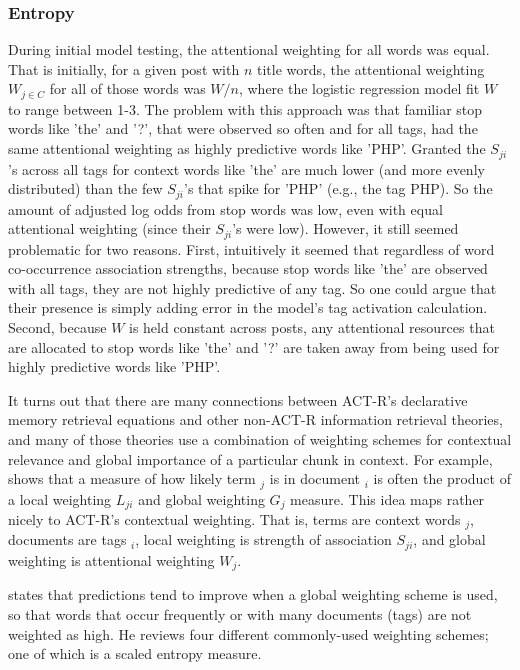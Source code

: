 \documentclass[10pt,letterpaper]{article}
\begin{document}
\subsubsection{Entropy}

During initial model testing, the attentional weighting for all words was equal.
That is initially, for a given post with $n$ title words, the attentional weighting $W_{j\in C}$ for all of those words was $W/n$, where the logistic regression model fit $W$ to range between 1-3.
The problem with this approach was that familiar stop words like 'the' and '?', that were observed so often and for all tags, had the same attentional weighting as highly predictive words like 'PHP'.
Granted the $S_{ji}$'s across all tags for context words like 'the' are much lower (and more evenly distributed) than the few $S_{ji}$'s that spike for 'PHP' (e.g., the tag PHP).
So the amount of adjusted log odds from stop words was low, even with equal attentional weighting (since their $S_{ji}$'s were low).
However, it still seemed problematic for two reasons.
First, intuitively it seemed that regardless of word co-occurrence association strengths, because stop words like 'the' are observed with all tags, they are not highly predictive of any tag.
So one could argue that their presence is simply adding error in the model's tag activation calculation.
Second, because $W$ is held constant across posts, any attentional resources that are allocated to stop words like 'the' and '?' are taken away from being used for highly predictive words like 'PHP'.

It turns out that there are many connections between ACT-R's declarative memory retrieval equations and other non-ACT-R information retrieval theories,
and many of those theories use a combination of weighting schemes for contextual relevance and global importance of a particular chunk in context.
For example,  shows that a measure of how likely term ${_j}$ is in document ${_i}$ is often the product of a local weighting $L_{ji}$ and global weighting $G_{j}$ measure.
This idea maps rather nicely to ACT-R's contextual weighting.
That is, terms are context words ${_j}$, documents are tags ${_i}$, local weighting is strength of association $S_{ji}$, and global weighting is attentional weighting $W_{j}$.

 states that predictions tend to improve when a global weighting scheme is used, so that words that occur frequently or with many documents (tags) are not weighted as high.
He reviews four different commonly-used weighting schemes; one of which is a scaled entropy measure.
\end{document}
